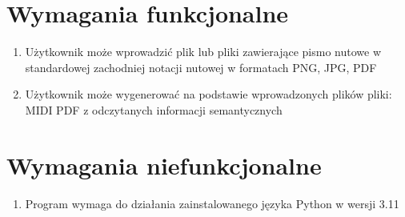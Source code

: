 \section{Wymagania funkcjonalne}
	\begin{enumerate}
		\item Użytkownik może wprowadzić plik lub pliki zawierające pismo nutowe w standardowej zachodniej notacji nutowej w formatach PNG, JPG, PDF
		\item Użytkownik może wygenerować na podstawie wprowadzonych plików pliki:
		\subitem MIDI
		\subitem PDF z odczytanych informacji semantycznych
	\end{enumerate}
	
	
\section{Wymagania niefunkcjonalne}

	\begin{enumerate}
		\item Program wymaga do działania zainstalowanego języka Python w wersji 3.11
	\end{enumerate}